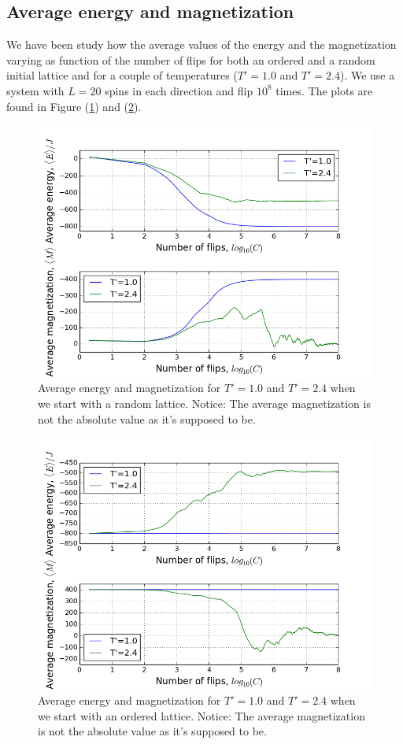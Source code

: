\documentclass[norsk,a4paper,12pt]{article}
\begin{document}
\subsection{Average energy and magnetization}
We have been study how the average values of the energy and the magnetization varying as function of the number of flips for both an ordered and a random initial lattice and for a couple of temperatures ($T'=1.0$ and $T'=2.4$). We use a system with $L=20$ spins in each direction and flip $10^8$ times. The plots are found in Figure (\ref{4c_random}) and (\ref{4c_ordered}). 
\begin{figure}[H]
\centering
\includegraphics[width=150mm]{plot_4c_E_M_random_new.png}
\caption{Average energy and magnetization for $T'=1.0$ and $T'=2.4$ when we start with a random lattice. Notice: The average magnetization is not the absolute value as it's supposed to be. \label{4c_random}}
\end{figure}
\begin{figure}[H]
\centering
\includegraphics[width=150mm]{plot_4c_E_M_ordered_new.png}
\caption{Average energy and magnetization for $T'=1.0$ and $T'=2.4$ when we start with an ordered lattice. Notice: The average magnetization is not the absolute value as it's supposed to be. \label{4c_ordered}}
\end{figure}
\end{document}
